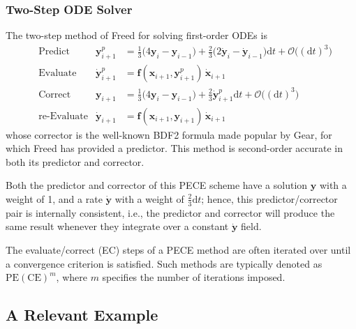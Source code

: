 \subsubsection{Two-Step ODE Solver}

The two-step method of Freed \cite{Freed17a} for solving first-order ODEs is
\begin{subequations}
    \label{1stOrderODEs}
    \begin{align}
    \mbox{} & \text{Predict} & 
    \mathbf{y}_{i+1}^p & = \tfrac{1}{3} 
    \bigl( 4 \mathbf{y}_i - \mathbf{y}_{i-1} \bigr) + 
    \tfrac{2}{3} \bigl( 2 \dot{\mathbf{y}}_i - \dot{\mathbf{y}}_{i-1} 
    \bigr) \mathrm{d}t + \mathcal{O} \bigl( (\mathrm{d}t)^3 \bigr)
    \label{1stOrderPredictor} \\
    \mbox{} & \text{Evaluate} & 
    \dot{\mathbf{y}}^p_{i+1} & = \mathbf{f} (\mathbf{x}_{i+1} , \mathbf{y}_{i+1}^p) \, \dot{\mathbf{x}}_{i+1}
    \label{1stOrderEvaluate} \\
    \mbox{} & \text{Correct} &
    \mathbf{y}_{i+1} & = \tfrac{1}{3} 
    \bigl( 4 \mathbf{y}_i - \mathbf{y}_{i-1} \bigr) + 
    \tfrac{2}{3} \dot{\mathbf{y}}^{p}_{i+1} \mathrm{d}t + 
    \mathcal{O} \bigl( (\mathrm{d}t)^3 \bigr)
    \label{1stOrderCorrector} \\
    \mbox{} & \text{re-Evaluate} & 
    \dot{\mathbf{y}}_{i+1} & = \mathbf{f} (\mathbf{x}_{i+1} , \mathbf{y}_{i+1}) \, 
    \dot{\mathbf{x}}_{i+1}
    \label{1stOrderReEvaluate}
    \end{align}
\end{subequations} 
whose corrector is the well-known BDF2 formula made popular by Gear, for which Freed has provided a predictor.  This method is second-order accurate in both its predictor and corrector.

Both the predictor and corrector of this PECE scheme have a solution $\mathbf{y}$ with a weight of 1, and a rate $\dot{\mathbf{y}}$ with a weight of $\tfrac{2}{3} \mathrm{d}t$; hence, this predictor\slash corrector pair is internally consistent, i.e., the predictor and corrector will produce the same result whenever they integrate over a constant $\dot{\mathbf{y}}$ field. 

The evaluate\slash correct (EC) steps of a PECE method are often iterated over until a convergence criterion is satisfied.  Such methods are typically denoted as $\text{PE}(\text{CE})^m$, where $m$ specifies the number of iterations imposed.


\subsection{A Relevant Example}

